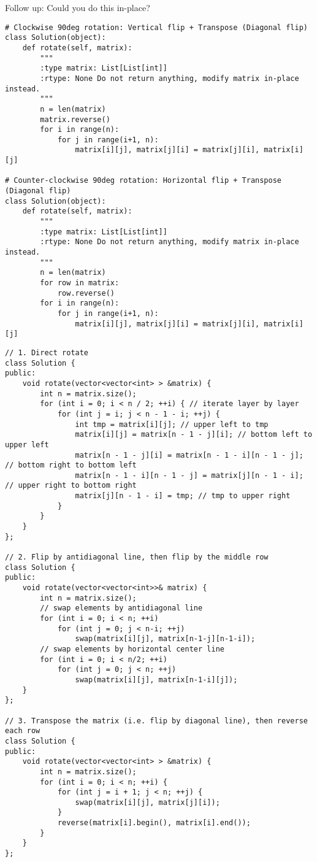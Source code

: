 Follow up: Could you do this in-place?\\

\begin{lstlisting}
# Clockwise 90deg rotation: Vertical flip + Transpose (Diagonal flip)
class Solution(object):
    def rotate(self, matrix):
        """
        :type matrix: List[List[int]]
        :rtype: None Do not return anything, modify matrix in-place instead.
        """
        n = len(matrix)
        matrix.reverse()
        for i in range(n):
            for j in range(i+1, n):
                matrix[i][j], matrix[j][i] = matrix[j][i], matrix[i][j]
                
# Counter-clockwise 90deg rotation: Horizontal flip + Transpose (Diagonal flip)
class Solution(object):
    def rotate(self, matrix):
        """
        :type matrix: List[List[int]]
        :rtype: None Do not return anything, modify matrix in-place instead.
        """
        n = len(matrix)
        for row in matrix:
            row.reverse()
        for i in range(n):
            for j in range(i+1, n):
                matrix[i][j], matrix[j][i] = matrix[j][i], matrix[i][j]                         
\end{lstlisting}

\begin{lstlisting}
// 1. Direct rotate
class Solution {
public:
    void rotate(vector<vector<int> > &matrix) {
        int n = matrix.size();
        for (int i = 0; i < n / 2; ++i) { // iterate layer by layer
            for (int j = i; j < n - 1 - i; ++j) {
                int tmp = matrix[i][j]; // upper left to tmp
                matrix[i][j] = matrix[n - 1 - j][i]; // bottom left to upper left
                matrix[n - 1 - j][i] = matrix[n - 1 - i][n - 1 - j]; // bottom right to bottom left
                matrix[n - 1 - i][n - 1 - j] = matrix[j][n - 1 - i]; // upper right to bottom right
                matrix[j][n - 1 - i] = tmp; // tmp to upper right
            }
        }
    }
};

// 2. Flip by antidiagonal line, then flip by the middle row
class Solution {
public:
    void rotate(vector<vector<int>>& matrix) {
        int n = matrix.size();
        // swap elements by antidiagonal line
        for (int i = 0; i < n; ++i)
            for (int j = 0; j < n-i; ++j)
                swap(matrix[i][j], matrix[n-1-j][n-1-i]);
        // swap elements by horizontal center line        
        for (int i = 0; i < n/2; ++i)
            for (int j = 0; j < n; ++j)
                swap(matrix[i][j], matrix[n-1-i][j]);
    }
};

// 3. Transpose the matrix (i.e. flip by diagonal line), then reverse each row
class Solution {
public:
    void rotate(vector<vector<int> > &matrix) {
        int n = matrix.size();
        for (int i = 0; i < n; ++i) {
            for (int j = i + 1; j < n; ++j) {
                swap(matrix[i][j], matrix[j][i]);
            }
            reverse(matrix[i].begin(), matrix[i].end());
        }
    }
};
\end{lstlisting}

